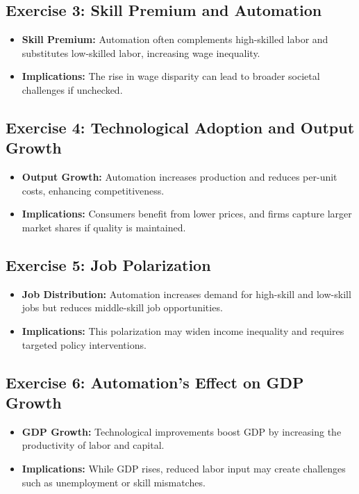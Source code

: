 \documentclass[12pt]{article}
\begin{document}
\subsection*{Exercise 3: Skill Premium and Automation}
\begin{itemize}
    \item \textbf{Skill Premium:} Automation often complements high-skilled labor and substitutes low-skilled labor, increasing wage inequality.
    \item \textbf{Implications:} The rise in wage disparity can lead to broader societal challenges if unchecked.
\end{itemize}

\subsection*{Exercise 4: Technological Adoption and Output Growth}
\begin{itemize}
    \item \textbf{Output Growth:} Automation increases production and reduces per-unit costs, enhancing competitiveness.
    \item \textbf{Implications:} Consumers benefit from lower prices, and firms capture larger market shares if quality is maintained.
\end{itemize}

\subsection*{Exercise 5: Job Polarization}
\begin{itemize}
    \item \textbf{Job Distribution:} Automation increases demand for high-skill and low-skill jobs but reduces middle-skill job opportunities.
    \item \textbf{Implications:} This polarization may widen income inequality and requires targeted policy interventions.
\end{itemize}

\subsection*{Exercise 6: Automation's Effect on GDP Growth}
\begin{itemize}
    \item \textbf{GDP Growth:} Technological improvements boost GDP by increasing the productivity of labor and capital.
    \item \textbf{Implications:} While GDP rises, reduced labor input may create challenges such as unemployment or skill mismatches.
\end{itemize}
\end{document}
